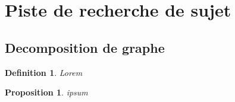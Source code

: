 \documentclass{paper}
\newtheorem{prop}{Proposition}
\newtheorem{defi}{Definition}
\begin{document}
\setlength{\headheight}{13.07225pt}
\addtolength{\topmargin}{-1.07225pt}



\section*{Piste de recherche de sujet}
\subsection*{Decomposition de graphe}
\begin{defi}
Lorem
\end{defi}

\begin{prop}
ipsum
\end{prop}
\end{document}
